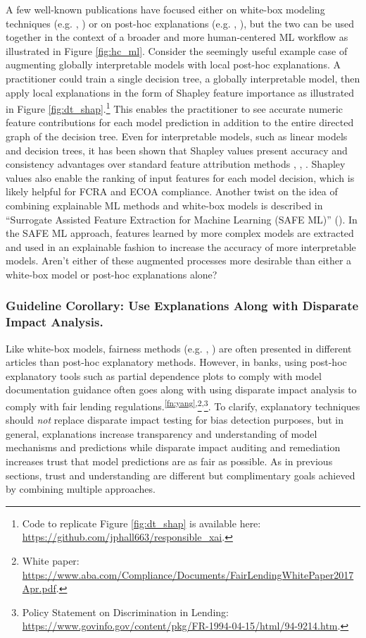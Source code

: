 \documentclass[fleqn]{article}
\begin{document}
A few well-known publications have focused either on white-box modeling techniques (e.g. \citet{slim}, \citet{sbrl}) or on post-hoc explanations (e.g.  \citet{shapley}, \citet{lime}), but the two can be used together in the context of a broader and more human-centered ML workflow as illustrated in Figure \ref{fig:hc_ml}. Consider the seemingly useful example case of augmenting globally interpretable models with local post-hoc explanations. A practitioner could train a single decision tree, a globally interpretable model, then apply local explanations in the form of Shapley feature importance as illustrated in Figure \ref{fig:dt_shap}.\footnote{Code to replicate Figure \ref{fig:dt_shap} is available here: \url{https://github.com/jphall663/responsible_xai}.} This enables the practitioner to see accurate numeric feature contributions for each model prediction in addition to the entire directed graph of the decision tree. Even for interpretable models, such as linear models and decision trees, it has been shown that Shapley values present accuracy and consistency advantages over standard feature attribution methods \cite{lipovetsky2001analysis}, \cite{tree_shap}, \cite{shapley}. Shapley values also enable the ranking of input features for each model decision, which is likely helpful for FCRA and ECOA compliance. Another twist on the idea of combining explainable ML methods and white-box models is described in ``Surrogate Assisted Feature Extraction for Machine Learning (SAFE ML)'' (\citet{gosiewska2019safe}). In the SAFE ML approach, features learned by more complex models are extracted and used in an explainable fashion to increase the accuracy of more interpretable models. Aren't either of these augmented processes more desirable than either a white-box model or post-hoc explanations alone?\\ 

\subsubsection{Guideline Corollary: Use Explanations Along with Disparate Impact Analysis.} Like white-box models, fairness methods (e.g. \citet{feldman2015certifying}, \citet{hardt2016equality}) are often presented in different articles than post-hoc explanatory methods. However, in banks, using post-hoc explanatory tools such as partial dependence plots to comply with model documentation guidance often goes along with using disparate impact analysis to comply with fair lending regulations.\textsuperscript{\ref{fn:yang},}\footnote{White paper: \url{https://www.aba.com/Compliance/Documents/FairLendingWhitePaper2017Apr.pdf}.}\textsuperscript{,}\footnote{Policy Statement on Discrimination in Lending: \url{https://www.govinfo.gov/content/pkg/FR-1994-04-15/html/94-9214.htm}.}. To clarify, explanatory techniques should \textit{not} replace disparate impact testing for bias detection purposes, but in general, explanations increase transparency and understanding of model mechanisms and predictions while disparate impact auditing and remediation increases trust that model predictions are as fair as possible. As in previous sections, trust and understanding are different but complimentary goals achieved by combining multiple approaches.
\end{document}
